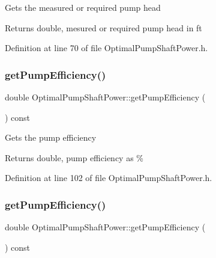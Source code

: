 Gets the measured or required pump head \begin{DoxyReturn}{Returns}
double, mesured or required pump head in ft 
\end{DoxyReturn}


Definition at line 70 of file Optimal\+Pump\+Shaft\+Power.\+h.

\mbox{\label{class_optimal_pump_shaft_power_a77b9c639438f9d6008c20948f173a2c4}} 
\subsubsection{\texorpdfstring{get\+Pump\+Efficiency()}{getPumpEfficiency()}\hspace{0.1cm}{\footnotesize\ttfamily [1/3]}}
{\footnotesize\ttfamily double Optimal\+Pump\+Shaft\+Power\+::get\+Pump\+Efficiency (\begin{DoxyParamCaption}{ }\end{DoxyParamCaption}) const\hspace{0.3cm}{\ttfamily [inline]}}

Gets the pump efficiency \begin{DoxyReturn}{Returns}
double, pump efficiency as \% 
\end{DoxyReturn}


Definition at line 102 of file Optimal\+Pump\+Shaft\+Power.\+h.

\mbox{\label{class_optimal_pump_shaft_power_a77b9c639438f9d6008c20948f173a2c4}} 
\subsubsection{\texorpdfstring{get\+Pump\+Efficiency()}{getPumpEfficiency()}\hspace{0.1cm}{\footnotesize\ttfamily [2/3]}}
{\footnotesize\ttfamily double Optimal\+Pump\+Shaft\+Power\+::get\+Pump\+Efficiency (\begin{DoxyParamCaption}{ }\end{DoxyParamCaption}) const\hspace{0.3cm}{\ttfamily [inline]}}

